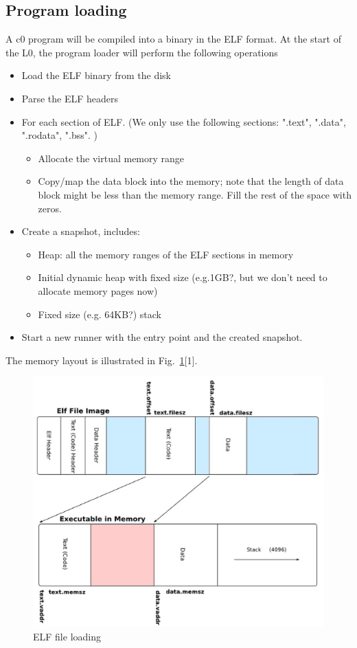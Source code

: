 \documentclass[a4paper]{article}
\begin{document}
{\color{lightblue}\subsection{Program loading}}

A c0 program will be compiled into a binary in the ELF format. 
At the start of the L0, the program loader will perform the following operations

\begin{itemize}
	\item Load the ELF binary from the disk
	\item Parse the ELF headers
	\item For each section of ELF. (We only use the following sections: ".text", ".data", ".rodata", ".bss". )
		\begin{itemize}
			\item Allocate the virtual memory range 
			\item Copy/map the data block into the memory; note that the length of data block might be less than the memory range. Fill the rest of the space with zeros.
		\end{itemize}
	\item Create a snapshot, includes:
		\begin{itemize}
			\item Heap: all the memory ranges of the ELF sections in memory
			\item Initial dynamic heap with fixed size (e.g.1GB?, but we don't need to allocate memory pages now)
			\item Fixed size (e.g. 64KB?) stack
		\end{itemize}
	\item Start a new runner with the entry point and the created snapshot.
\end{itemize}
The memory layout is illustrated in Fig.~\ref{fig:c0-elf}[1].\\
\begin{figure}[htbp]
\begin{center}
  \includegraphics[width=5.8in]{figure/elf.eps}
  \caption{ELF file loading}
  \label{fig:c0-elf}
\end{center}
\end{figure}
\end{document}
